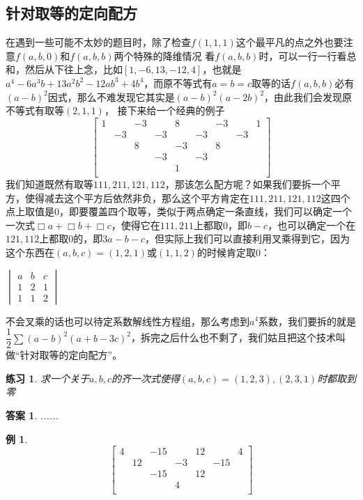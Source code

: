\documentclass[UTF8]{ctexart}
\newtheorem{1}{例}
\newtheorem{3}{练习}
\newtheorem{4}{答案}
\begin{document}
\subsection{针对取等的定向配方}
在遇到一些可能不太妙的题目时，除了检查$ f(1,1,1) $这个最平凡的点之外也要注意$ f(a,b,0) $和$ f(a,b,b) $两个特殊的降维情况
看$ f(a,b,b) $时，可以一行一行看总和，然后从下往上念，比如$ [1, -6, 13, -12, 4] $，也就是$ a^{4}-6a^{3}b+13a^{2}b^{2}-12ab^{3}+4b^{4} $，而原不等式有$ a=b=c $取等的话$ f(a,b,b) $必有$ (a-b)^{2} $因式，那么不难发现它其实是$ (a-b)^{2}(a-2b)^{2} $，由此我们会发现原不等式有取等$ (2,1,1) $，
接下来给一个经典的例子
\renewcommand*{\arraystretch}{1.732}\[
\left[\begin{matrix}
	1& &-3& &8& &-3& &1\\
	&-3& &-3& &-3& &-3&\\
	& &8& &-3& &8& &\\
	& & &-3& &-3& & &\\
	& & & &1& & & &\\
\end{matrix}\right]
\]
我们知道既然有取等$ 111,211,121,112 $，那该怎么配方呢？如果我们要拆一个平方，使得减去这个平方后依然非负，那么这个平方肯定在$ 111,211,121,112 $这四个点上取值是$ 0 $，即要覆盖四个取等，类似于两点确定一条直线，我们可以确定一个一次式$ \Box a+\Box b+\Box c $，使得它在$ 111,211 $上都取$ 0 $，即$ b-c $，也可以确定一个在$ 121,112 $上都取$ 0 $的，即$ 3a-b-c $，但实际上我们可以直接利用叉乘得到它，因为这个东西在$ (a,b,c)=(1,2,1) $或$ (1,1,2) $的时候肯定取$ 0 $：
\begin{center}
	$ \begin{vmatrix}
		a& b & c\\
		1& 2 & 1\\
		1& 1 & 2
	\end{vmatrix} $
\end{center}
不会叉乘的话也可以待定系数解线性方程组，那么考虑到$ a^{4} $系数，我们要拆的就是$\dfrac{1}{2} \displaystyle \sum (a-b)^{2}(a+b-3c)^{2} $，拆完之后什么也不剩了，我们姑且把这个技术叫做“针对取等的定向配方”。\\
\begin{3}
	求一个关于$ a,b,c $的齐一次式使得$ (a,b,c)=(1,2,3),(2,3,1) $时都取到零
\end{3}
\begin{4}
	......
\end{4}
\begin{1}
\renewcommand*{\arraystretch}{1.732}\[
\left[\begin{matrix}
	4& &-15& &12& &4\\
	&12& &-3& &-15&\\
	& &-15& &12& & \\
	& & &4& & &\\
\end{matrix}\right]
\]
\end{1}
\end{document}
